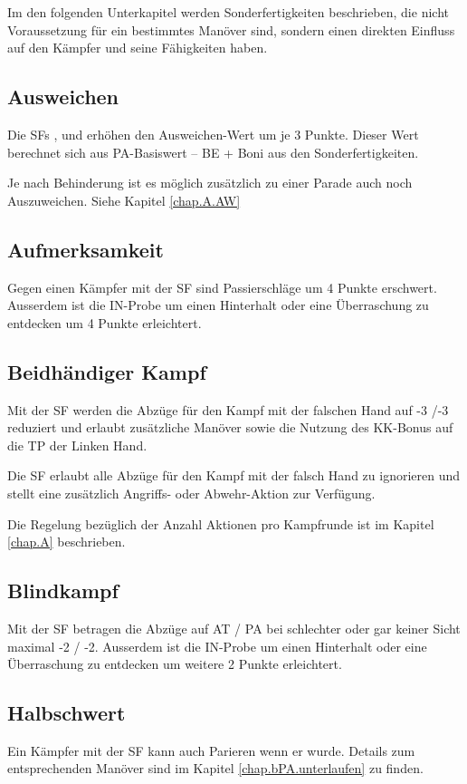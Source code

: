Im den folgenden Unterkapitel werden Sonderfertigkeiten beschrieben, die nicht
Voraussetzung für ein bestimmtes Manöver sind, sondern einen direkten Einfluss
auf den Kämpfer und seine Fähigkeiten haben.

\subsection{Ausweichen}
Die SFs ,  und
 erhöhen den Ausweichen-Wert um je 3 Punkte. Dieser
Wert berechnet sich aus PA-Basiswert – BE + Boni aus den Sonderfertigkeiten.

Je nach Behinderung ist es möglich zusätzlich zu einer Parade auch noch
Auszuweichen. Siehe Kapitel \ref{chap.A.AW}

\subsection{Aufmerksamkeit}
Gegen einen Kämpfer mit der SF  sind Passierschläge
um 4 Punkte erschwert. Ausserdem ist die IN-Probe um einen Hinterhalt oder eine
Überraschung zu entdecken um 4 Punkte erleichtert.

\subsection{Beidhändiger Kampf}
Mit der SF  werden die Abzüge für den Kampf
mit der falschen Hand auf -3 /-3 reduziert und erlaubt zusätzliche Manöver
sowie die Nutzung des KK-Bonus auf die TP der Linken Hand.

Die SF  erlaubt alle Abzüge für den Kampf
mit der falsch Hand zu ignorieren und stellt eine zusätzlich Angriffs- oder
Abwehr-Aktion zur Verfügung.

Die Regelung bezüglich der Anzahl Aktionen pro Kampfrunde ist im Kapitel
\ref{chap.A} beschrieben.

\subsection{Blindkampf}
Mit der SF  betragen die Abzüge auf AT / PA bei
schlechter oder gar keiner Sicht maximal -2 / -2. Ausserdem ist die IN-Probe um
einen Hinterhalt oder eine Überraschung zu entdecken um weitere 2 Punkte
erleichtert.

\subsection{Halbschwert}
Ein Kämpfer mit der SF  kann auch Parieren wenn er
 wurde. Details zum entsprechenden Manöver sind im
Kapitel \ref{chap.bPA.unterlaufen} zu finden.

